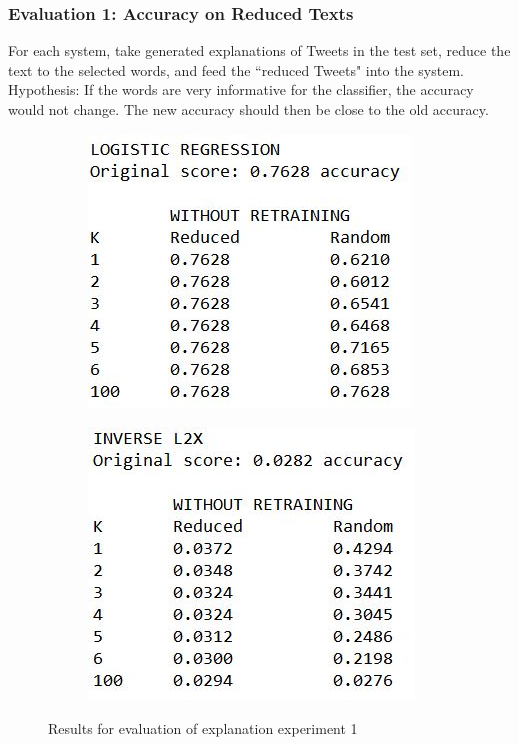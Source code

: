 \subsubsection{Evaluation 1: Accuracy on Reduced Texts}
For each system, take generated explanations of Tweets in the test set, reduce the text to the selected words, and feed the ``reduced Tweets" into the system. Hypothesis: If the words are very informative for the classifier, the accuracy would not change. The new accuracy should then be close to the old accuracy.\newline
\begin{figure}[H]
	\begin{subfigure}[b]{0.4\textwidth}
		\includegraphics[width=\textwidth]{img/expleval1_logreg.JPG}
	\end{subfigure}
	\begin{subfigure}[b]{0.4\textwidth}
		\includegraphics[width=\textwidth]{img/expleval1_invL2X.JPG}
	\end{subfigure}
	\caption{Results for evaluation of explanation experiment 1}
	\label{fig:results_expleval1}
\end{figure}
